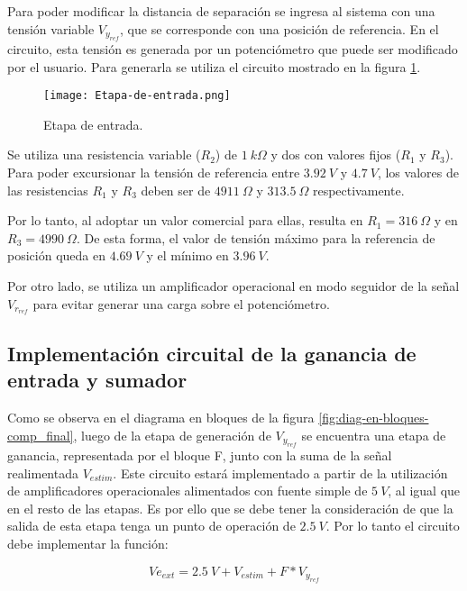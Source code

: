\noindent Para poder modificar la distancia de separación se ingresa al sistema con una tensión variable $V_{y_{ref}}$, que se corresponde con una posición de referencia. En el circuito, esta tensión es generada por un potenciómetro que puede ser modificado por el usuario. Para generarla se utiliza el circuito mostrado en la figura \ref{fig:etapa-de-entrada}.

\begin{figure}[H]
	\centering
	\texttt{[image: Etapa-de-entrada.png]}
	\caption{ Etapa de entrada.}
	\label{fig:etapa-de-entrada}
\end{figure}

Se utiliza una resistencia variable ($R_2$) de $1\:k\Omega$ y dos con valores fijos ($R_1$ y $R_3$). Para poder excursionar la tensión de referencia entre $3.92\:V$ y $4.7\:V$, los valores de las resistencias $R_1$ y $R_3$ deben ser de $4911\:\Omega$ y $313.5\:\Omega$ respectivamente. 

Por lo tanto, al adoptar un valor comercial para ellas, resulta en $R_1 = 316 \:\Omega$ y en $R_3 = 4990 \:\Omega$. De esta forma, el valor de tensión máximo para la referencia de posición queda en $4.69\:V$ y el mínimo en $3.96\:V$.

Por otro lado, se utiliza un amplificador operacional en modo seguidor de la señal $V_{r_{ref}}$ para evitar generar una carga sobre el potenciómetro. 

\subsection{Implementación circuital de la ganancia de entrada y sumador}

Como se observa en el diagrama en bloques de la figura \ref{fig:diag-en-bloques-comp_final}, luego de la etapa de generación de $V_{y_{ref}}$ se encuentra una etapa de ganancia, representada por el bloque F, junto con la suma de la señal realimentada $V_{estim}$. Este circuito estará implementado a partir de la utilización de amplificadores operacionales alimentados con fuente simple de $5\:V$, al igual que en el resto de las etapas. Es por ello que se debe tener la consideración de que la salida de esta etapa tenga un punto de operación de $2.5\:V$. Por lo tanto el circuito debe implementar la función:

\begin{equation*} 
	Ve_{ext}= 2.5\:V + V_{estim} + F*V_{y_{ref}}
\end{equation*}

